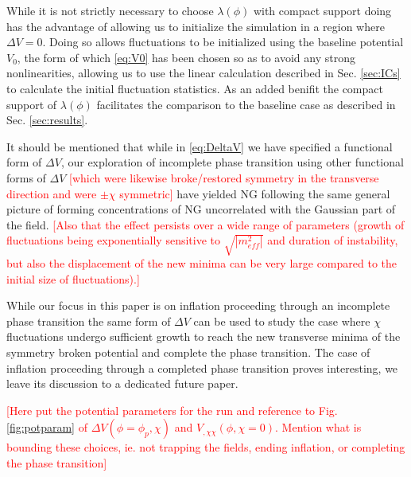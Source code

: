 While it is not strictly necessary to choose $\lambda(\phi)$ with compact support doing has the advantage of allowing us to initialize the simulation in a region where $\Delta V=0$. Doing so allows fluctuations to be initialized using the baseline potential $V_0$, the form of which \eqref{eq:V0} has been chosen so as to avoid any strong nonlinearities, allowing us to use the linear calculation described in Sec. \ref{sec:ICs} to calculate the initial fluctuation statistics. As an added benifit the compact support of $\lambda(\phi)$ facilitates the comparison to the baseline case as described in Sec. \ref{sec:results}.

It should be mentioned that while in \eqref{eq:DeltaV} we have specified a functional form of $\Delta V$, our exploration of incomplete phase transition using other functional forms of $\Delta V$ \textcolor{red}{[which were likewise broke/restored symmetry in the transverse direction and were $\pm\chi$ symmetric]} have yielded NG following the same general picture of forming concentrations of NG uncorrelated with the Gaussian part of the field. \textcolor{red}{[Also that the effect persists over a wide range of parameters (growth of fluctuations being exponentially sensitive to $\sqrt{|m^2_{eff}|}$ and duration of instability, but also the displacement of the new minima can be very large compared to the initial size of fluctuations).]}

\Fpotential

While our focus in this paper is on inflation proceeding through an incomplete phase transition the same form of $\Delta V$ can be used to study the case where $\chi$ fluctuations undergo sufficient growth to reach the new transverse minima of the symmetry broken potential and complete the phase transition. The case of inflation proceeding through a completed phase transition proves interesting, we leave its discussion to a dedicated future paper.

\Fpotparam

\textcolor{red}{[Here put the potential parameters for the run and reference to Fig. \ref{fig:potparam} of $\Delta V(\phi=\phi_p,\chi)$ and $V_{,\chi\chi}(\phi,\chi=0)$. Mention what is bounding these choices, ie. not trapping the fields, ending inflation, or completing the phase transition]}


